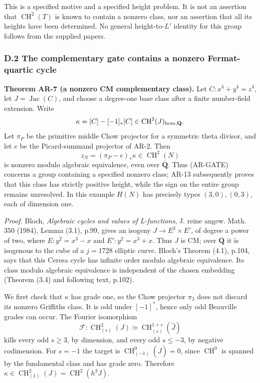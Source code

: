\documentclass[11pt,a4paper]{article}
\begin{document}
This is a specified motive and a specified height problem. It is not an
assertion that \(\operatorname{CH}^2(T)\) is known to contain a nonzero
class, nor an assertion that all its heights have been determined. No
general height-to-\(L'\) identity for this group follows from the
supplied papers.

\subsubsection{D.2 The complementary gate contains a nonzero
Fermat-quartic
cycle}\label{d.2-the-complementary-gate-contains-a-nonzero-fermat-quartic-cycle}

\textbf{Theorem AR-7 (a nonzero CM complementary class).} Let
\(C:x^4+y^4=z^4\), let \(J=\operatorname{Jac}(C)\), and choose a
degree-one base class after a finite number-field extension. Write \[
\kappa=[C]-[-1]_*[C]\in\operatorname{CH}^2(J)_{\rm hom,\mathbf Q}.
\] Let \(\pi_P\) be the primitive middle Chow projector for a symmetric
theta divisor, and let \(e\) be the Picard-summand projector of AR-2.
Then \[
z_N=(\pi_P-e)_*\kappa\in\operatorname{CH}^2(N)
\tag{AR.9}
\] is nonzero modulo algebraic equivalence, even over
\(\overline{\mathbf Q}\). Thus (AR-GATE) concerns a group containing a
specified nonzero class; AR-13 subsequently proves that this class has
strictly positive height, while the sign on the entire group remains
unresolved. In this example \(H(N)\) has precisely types
\((3,0),(0,3)\), each of dimension one.

\emph{Proof.} Bloch, \emph{Algebraic cycles and values of L-functions},
J. reine angew. Math. 350 (1984), Lemma (3.1), p.99, gives an isogeny
\(J\to E^2\times E'\), of degree a power of two, where \(E:y^2=x^3-x\)
and \(E':y^2=x^3+x\). Thus \(J\) is CM; over \(\overline{\mathbf Q}\) it
is isogenous to the cube of a \(j=1728\) elliptic curve. Bloch's Theorem
(4.1), p.104, says that this Ceresa cycle has infinite order modulo
algebraic equivalence. Its class modulo algebraic equivalence is
independent of the chosen embedding (Theorem (3.4) and following text,
p.102).

We first check that \(\kappa\) has grade one, so the Chow projector
\(\pi_3\) does not discard its nonzero Griffiths class. It is odd under
\([-1]^*\), hence only odd Beauville grades can occur. The Fourier
isomorphism \[
\mathcal F:\operatorname{CH}^2_{(s)}(J)
 \simeq\operatorname{CH}^{1+s}_{(s)}(\widehat J)
\] kills every odd \(s\ge3\), by dimension, and every odd \(s\le-3\), by
negative codimension. For \(s=-1\) the target is
\(\operatorname{CH}^0_{(-1)}(\widehat J)=0\), since
\(\operatorname{CH}^0\) is spanned by the fundamental class and has
grade zero. Therefore
\(\kappa\in\operatorname{CH}^2_{(1)}(J)=\operatorname{CH}^2(h^3J)\).
\end{document}
